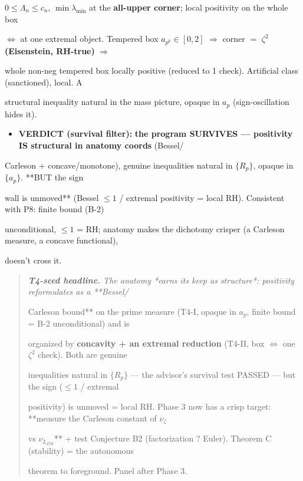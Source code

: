\documentclass[10pt]{article}
\begin{document}
  $0\le\Lambda_n\le c_n$, $\min\lambda_{\min}$ at the \textbf{all-upper corner}; local positivity on the whole box\par
  \ensuremath{\iff} at one extremal object. Tempered box $a_{p^k}\in[0,2]$ \ensuremath{\Rightarrow} corner $=$ \textbf{$\zeta^2$ (Eisenstein, RH-true)} \ensuremath{\Rightarrow}\par
  whole non-neg tempered box locally positive (reduced to 1 check). Artificial class (sanctioned), local. A\par
  structural inequality natural in the mass picture, opaque in $a_p$ (sign-oscillation hides it).\par
\begin{itemize}
\item \textbf{VERDICT (survival filter):} \textbf{the program SURVIVES --- positivity IS structural in anatomy coords} (Bessel/
\end{itemize}
  Carleson + concave/monotone), genuine inequalities natural in $\{R_p\}$, opaque in $\{a_p\}$. **BUT the sign\par
  wall is unmoved** (Bessel $\le1$ / extremal positivity = local RH). Consistent with P8: finite bound (B-2)\par
  unconditional, $\le1$ = RH; anatomy makes the dichotomy crisper (a Carleson measure, a concave functional),\par
  doesn't cross it.\par

\begin{quote}\itshape
\textbf{T4-seed headline.} The anatomy *earns its keep as structure*: positivity reformulates as a **Bessel/\par
Carleson bound** on the prime measure (T4-I, opaque in $a_p$, finite bound = B-2 unconditional) and is\par
organized by \textbf{concavity + an extremal reduction} (T4-II, box \ensuremath{\iff} one $\zeta^2$ check). Both are genuine\par
inequalities natural in $\{R_p\}$ --- the advisor's survival test PASSED --- but the sign ($\le1$ / extremal\par
positivity) is unmoved = local RH. Phase 3 now has a crisp target: **measure the Carleson constant of $\nu_\zeta$\par
vs $\nu_{L_{DH}}$** + test Conjecture B2 (factorization ? Euler). Theorem C (stability) = the autonomous\par
theorem to foreground. Panel after Phase 3.\par
\end{quote}
\end{document}
